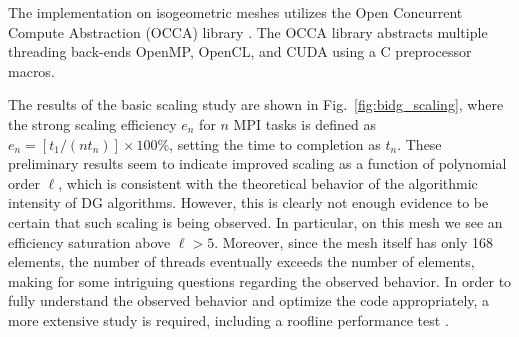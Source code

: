 The implementation on isogeometric meshes utilizes the Open Concurrent Compute
Abstraction (OCCA) library \cite{MedinaPress}.  The OCCA library abstracts
multiple threading back-ends OpenMP, OpenCL, and CUDA using a C preprocessor
macros.


The results of the basic scaling study are shown in
Fig.~\ref{fig:bidg_scaling}, where the strong scaling efficiency $e_{n}$ for
$n$ MPI tasks is defined as $e_{n}= [t_{1}/(nt_{n})]\times 100\%$, setting the time to
completion as $t_n$. These preliminary results seem to indicate improved scaling as a function of polynomial order $\ell$, which is consistent with the theoretical
behavior of the algorithmic intensity of DG algorithms.  However, this is
clearly not enough evidence to be certain that such scaling is being observed.
In particular, on this mesh we see an efficiency saturation above $\ell>5$.
Moreover, since the mesh itself has only 168 elements, the number of threads
eventually exceeds the number of elements, making for some intriguing questions
regarding the observed behavior.  In order to fully understand the observed behavior and
optimize the code appropriately, a more extensive study is required, including
%
a roofline performance test
\cite{Williams:2009:RIV:1498765.1498785}.

%
%




